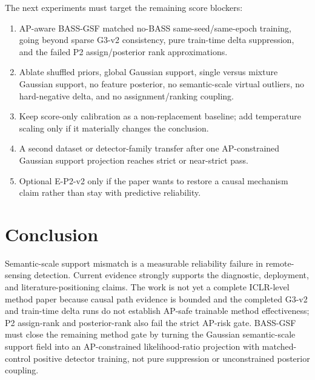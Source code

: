 \documentclass[10pt]{article}
\begin{document}
The next experiments must target the remaining score blockers:
\begin{enumerate}
  \item AP-aware BASS-GSF matched no-BASS same-seed/same-epoch training, going
  beyond sparse G3-v2 consistency, pure train-time delta suppression, and the
  failed P2 assign/posterior rank approximations.
  \item Ablate shuffled priors, global Gaussian support, single versus mixture
  Gaussian support, no feature posterior, no semantic-scale virtual outliers,
  no hard-negative delta, and no assignment/ranking coupling.
  \item Keep score-only calibration as a non-replacement baseline; add
  temperature scaling only if it materially changes the conclusion.
  \item A second dataset or detector-family transfer after one AP-constrained
  Gaussian support projection reaches strict or near-strict pass.
  \item Optional E-P2-v2 only if the paper wants to restore a causal mechanism
  claim rather than stay with predictive reliability.
\end{enumerate}

\section{Conclusion}

Semantic-scale support mismatch is a measurable reliability failure in
remote-sensing detection.  Current evidence strongly supports the diagnostic,
deployment, and literature-positioning claims.  The work is not yet a complete
ICLR-level method paper because causal path evidence is bounded and the
completed G3-v2 and train-time delta runs do not establish AP-safe trainable
method effectiveness; P2 assign-rank and posterior-rank also fail the strict
AP-risk gate.  BASS-GSF must close the remaining method gate by turning the
Gaussian semantic-scale support field into an AP-constrained likelihood-ratio
projection with matched-control positive detector training, not pure
suppression or unconstrained posterior coupling.

\appendix




\end{document}
